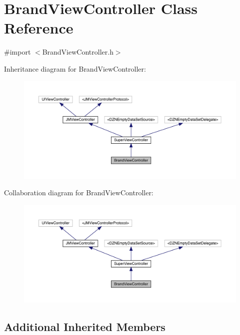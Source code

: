 \hypertarget{interface_brand_view_controller}{}\section{Brand\+View\+Controller Class Reference}
\label{interface_brand_view_controller}


{\ttfamily \#import $<$Brand\+View\+Controller.\+h$>$}



Inheritance diagram for Brand\+View\+Controller\+:\nopagebreak
\begin{figure}[H]
\begin{center}
\leavevmode
\includegraphics[width=350pt]{interface_brand_view_controller__inherit__graph}
\end{center}
\end{figure}


Collaboration diagram for Brand\+View\+Controller\+:\nopagebreak
\begin{figure}[H]
\begin{center}
\leavevmode
\includegraphics[width=350pt]{interface_brand_view_controller__coll__graph}
\end{center}
\end{figure}
\subsection*{Additional Inherited Members}



